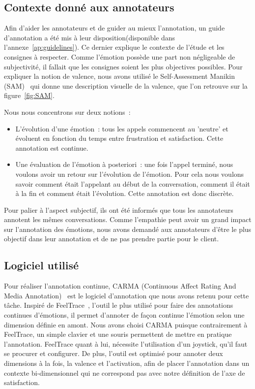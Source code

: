 \subsection{Contexte donné aux annotateurs}
Afin d'aider les annotateurs et de guider au mieux l'annotation, un guide d'annotation a été mis à leur disposition(disponible dans l'annexe~\ref{ap:guidelines}). Ce dernier explique le contexte de l'étude et les consignes à respecter. Comme l'émotion possède une part non négligeable de subjectivité, il fallait que les consignes soient les plus objectives possibles.
Pour expliquer la notion de valence, nous avons utilisé le Self-Assessment Manikin (SAM)~\cite{SAM} qui donne une description visuelle de la valence, que l'on retrouve sur la figure~\ref{fig:SAM}.

Nous nous concentrons sur deux notions :
\begin{itemize}
  \item L'évolution d'une émotion : tous les appels commencent au 'neutre' et évoluent en fonction du temps entre frustration et satisfaction. Cette annotation est continue.
  \item Une évaluation de l'émotion à posteriori : une fois l'appel terminé, nous voulons avoir un retour sur l'évolution de l'émotion. Pour cela nous voulons savoir comment était l'appelant au début de la conversation, comment il était à la fin et comment était l'évolution. Cette annotation est donc discrète.
\end{itemize}

Pour palier à l'aspect subjectif, ils ont été informés que tous les annotateurs annotent les mêmes conversations. Comme l'empathie peut avoir un grand impact sur l'annotation des émotions, nous avons demandé aux annotateurs d'être le plus objectif dans leur annotation et de ne pas prendre partie pour le client.

\subsection{Logiciel utilisé}

Pour réaliser l'annotation continue, CARMA (Continuous Affect Rating And Media Annotation)~\cite{CARMA} est le logiciel d'annotation que nous avons retenu pour cette tâche. Inspiré de FeelTrace~\cite{FeelTrace}, l'outil le plus utilisé pour faire des annotations continues d'émotions, il permet d'annoter de façon continue l'émotion selon une dimension définie en amont. Nous avons choisi CARMA puisque contrairement à FeelTrace, un simple clavier et une souris permettent de mettre en pratique l'annotation. FeelTrace quant à lui, nécessite l'utilisation d'un joystick, qu'il faut se procurer et configurer. De plus, l’outil est optimisé pour annoter deux dimensions à la fois, la valence et l'activation, afin de placer l'annotation dans un contexte bi-dimensionnel qui ne correspond pas avec notre définition de l'axe de satisfaction.


